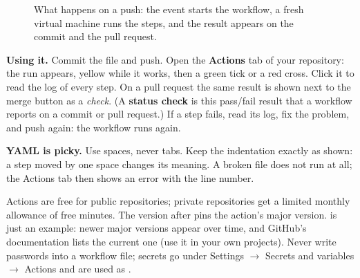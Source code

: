 \begin{figure}[H]
\centering
{}
\caption{What happens on a push: the event starts the workflow, a fresh virtual machine runs the steps, and the result appears on the commit and the pull request.}
\label{fig:actions}
\end{figure}

\textbf{Using it.} Commit the file  and push. Open the \textbf{Actions} tab of your repository: the run appears, yellow while it works, then a green tick or a red cross. Click it to read the log of every step. On a pull request the same result is shown next to the merge button as a \emph{check}. (A \textbf{status check} is this pass/fail result that a workflow reports on a commit or pull request.) If a step fails, read its log, fix the problem, and push again: the workflow runs again.

\begin{pitfall}
\textbf{YAML is picky.} Use spaces, never tabs. Keep the indentation exactly as shown: a step moved by one space changes its meaning. A broken file does not run at all; the Actions tab then shows an error with the line number.
\end{pitfall}

\begin{quickfact}
Actions are free for public repositories; private repositories get a limited monthly allowance of free minutes. The version after  pins the action's major version.  is just an example: newer major versions appear over time, and GitHub's documentation lists the current one (use it in your own projects). Never write passwords into a workflow file; secrets go under Settings $\rightarrow$ Secrets and variables $\rightarrow$ Actions and are used as .
\end{quickfact}

